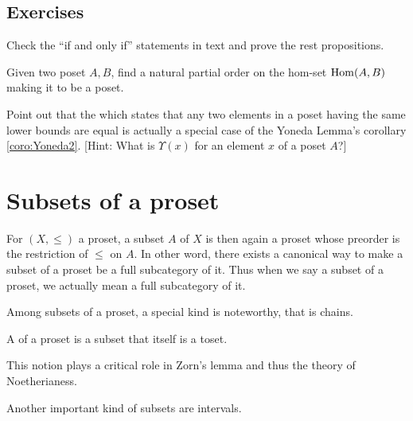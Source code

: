 \subsection{Exercises}
  \begin{ex}
    Check the ``if and only if'' statements in text and prove the rest propositions.
  \end{ex}
  \begin{ex}
    Given two poset $A,B$, find a natural partial order on the hom-set $\operatorname{Hom}(A,B)$ making it to be a poset.
  \end{ex}
  \begin{ex}
    Point out that the  which states that any two elements in a poset having the same lower bounds are equal is actually a special case of the Yoneda Lemma's corollary \ref{coro:Yoneda2}. [Hint: What is $\Upsilon(x)$ for an element $x$ of a poset $A$?]
  \end{ex}


\newpage\section{Subsets of a proset}
  For $(X,\leqslant)$ a proset, a subset $A$ of $X$ is then again a proset whose preorder is the restriction of $\leqslant$ on $A$. In other word, there exists a canonical way to make a subset of a proset be a full subcategory of it. Thus when we say a subset of a proset, we actually mean a full subcategory of it.

  Among subsets of a proset, a special kind is noteworthy, that is chains.
  \begin{defn}
  A  of a proset is a subset that itself is a toset.
  \end{defn}
  This notion plays a critical role in Zorn's lemma and thus the theory of Noetherianess.

  Another important kind of subsets are intervals.


